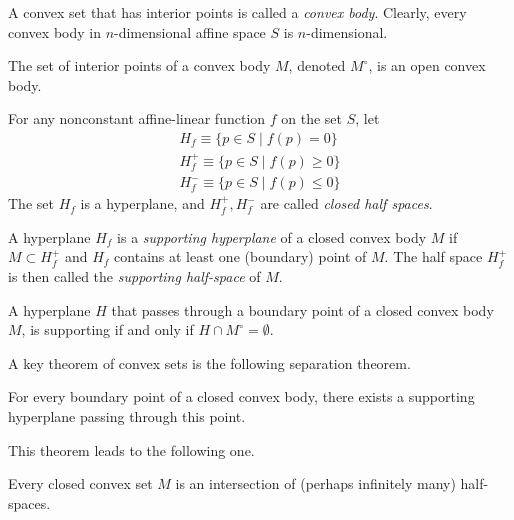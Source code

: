 \documentclass{article}
\begin{document}
    \begin{definition}
    A convex set that has interior points is called a \textit{convex body}. Clearly, every convex body in $n$-dimensional affine space $S$ is $n$-dimensional. 
    \end{definition}

    The set of interior points of a convex body $M$, denoted $M^\circ$, is an open convex body. 

    \begin{definition}
    For any nonconstant affine-linear function $f$ on the set $S$, let
    \begin{align*}
        H_f \equiv \{p \in S \;|\; f(p) = 0\} \\
        H^+_f \equiv \{p \in S \;|\; f(p) \geq 0\} \\
        H^-_f \equiv \{p \in S \;|\; f(p) \leq 0\}
    \end{align*}
    The set $H_f$ is a hyperplane, and $H^+_f, H^-_f$ are called \textit{closed half spaces}. 
    \end{definition}

    \begin{definition}
    A hyperplane $H_f$ is a \textit{supporting hyperplane} of a closed convex body $M$ if $M \subset H^+_f$ and $H_f$ contains at least one (boundary) point of $M$. The half space $H^+_f$ is then called the \textit{supporting half-space} of $M$. 
    \end{definition}

    \begin{proposition}
    A hyperplane $H$ that passes through a boundary point of a closed convex body $M$, is supporting if and only if $H \cap M^\circ = \emptyset$. 
    \end{proposition}

    A key theorem of convex sets is the following separation theorem. 

    \begin{theorem}
    For every boundary point of a closed convex body, there exists a supporting hyperplane passing through this point. 
    \end{theorem}

    This theorem leads to the following one. 

    \begin{theorem}
    Every closed convex set $M$ is an intersection of (perhaps infinitely many) half-spaces. 
    \end{theorem}
\end{document}
